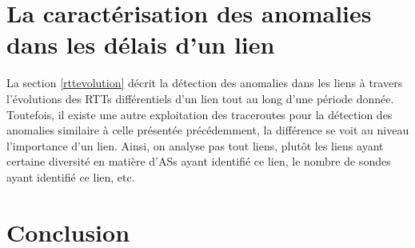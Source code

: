 \section{La caractérisation des anomalies dans les délais d'un lien}
La section \ref{rttevolution} décrit la détection des anomalies dans les liens à travers l'évolutions des RTTs différentiels d'un lien tout au long d'une période donnée. Toutefois, il existe une autre exploitation des traceroutes pour la détection des anomalies similaire à celle présentée précédemment, la différence se voit au niveau l'importance d'un lien. Ainsi, on analyse pas tout liens, plutôt les liens ayant certaine diversité en matière d'ASs ayant identifié ce lien, le nombre de sondes ayant identifié ce lien, etc. 

\section{Conclusion}